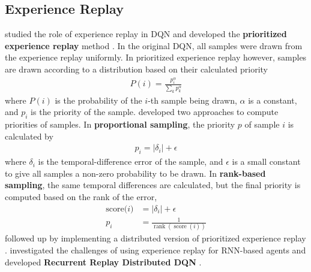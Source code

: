\subsection{Experience Replay}
\citeauthor{PrioritizedExperienceReplay_Schaul.Quan.ea_2016} studied the role of experience replay in DQN and developed the \textbf{prioritized experience replay} method \cite{PrioritizedExperienceReplay_Schaul.Quan.ea_2016}.
In the original DQN, all samples were drawn from the experience replay uniformly.
In prioritized experience replay however, samples are drawn according to a distribution based on their calculated priority
\begin{align*}
    P(i)=\frac{p_{i}^{\alpha}}{\sum_{k} p_{k}^{\alpha}}
\end{align*}
where $P(i)$ is the probability of the $i$-th sample being drawn, $\alpha$ is a constant, and $p_i$ is the priority of the sample.
\citeauthor{PrioritizedExperienceReplay_Schaul.Quan.ea_2016} developed two approaches to compute priorities of samples.
In \textbf{proportional sampling}, the priority $p$ of sample $i$ is calculated by
\begin{align*}
    p_i = \left|\delta_{i}\right|+\epsilon
\end{align*}
where $\delta_{i}$ is the temporal-difference error of the sample, and $\epsilon$ is a small constant to give all samples a non-zero probability to be drawn.
In \textbf{rank-based sampling}, the same temporal differences are calculated, but the final priority is computed based on the rank of the error,
\begin{align*}
    \text{score($i$)}  & = \left|\delta_{i}\right|+\epsilon  \\
    p_{i}              & = \frac{1}{\operatorname{rank}(\operatorname{score}(i))}
\end{align*}
\citeauthor{DistributedPrioritizedExperience_Horgan.Quan.ea_2022} followed up by implementing a distributed version of prioritized experience replay \cite{DistributedPrioritizedExperience_Horgan.Quan.ea_2022}.
\citeauthor{RecurrentExperienceReplay_Kapturowski.Ostrovski.ea_2022} investigated the challenges of using experience replay for RNN-based agents and developed \textbf{Recurrent Replay Distributed DQN} \cite{RecurrentExperienceReplay_Kapturowski.Ostrovski.ea_2022}.

